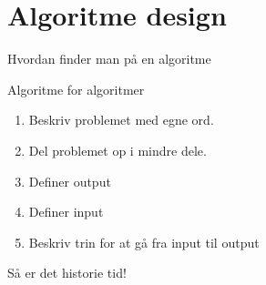 \documentclass[12pt,t]{beamer}
\begin{document}
\section{Algoritme design}
    \begin{frame}[c]{Hvordan finder man på en algoritme}
        \begin{block}{Algoritme for algoritmer}
            \begin{enumerate}
                \item Beskriv problemet med egne ord. \pause
                \item Del problemet op i mindre dele. \pause
                \item Definer output \pause
                \item Definer input \pause
                \item Beskriv trin for at gå fra input til output
            \end{enumerate}
        \end{block}
    \end{frame}

    \begin{frame}[c]
        \centering \Huge{Så er det historie tid!}
    \end{frame}
\end{document}
